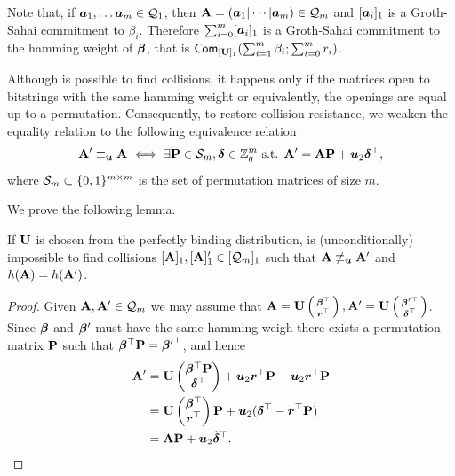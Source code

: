 Note that, if ${\boldsymbol{a}}_1,\ldots {\boldsymbol{a}}_m\in\mathcal{Q}_{1}$, then $\matr{A} = (\vec{a}_1\cat\cdots\cat\vecb{a}_m)\in\mathcal{Q}_{m}$ and $[{\boldsymbol{a}}_i]_1$ is a Groth-Sahai commitment to $\beta_i$.
Therefore $\sum_{i=0}^m[{\boldsymbol{a}}_i]_1$ is a Groth-Sahai commitment to the hamming weight of ${\boldsymbol{\beta}}$, that is $\mathsf{Com}_{[\mathbf{{U}}]_1}(\sum_{i=1}^m \beta_i;\sum_{i=0}^m r_i)$.

Although is possible to find collisions, it happens only if the matrices open to bitstrings with the same hamming weight or equivalently, the openings are equal up to a permutation. Consequently, to restore collision resistance, we weaken the equality relation to the following equivalence relation
$$
\mathbf{{A}}' \equiv_{\boldsymbol{u}} \mathbf{{A}} \iff \exists \mathbf{{P}}\in\mathcal{S}_m, {\boldsymbol{\delta}}\in\mathbb{Z}_q^m \text{ s.t. } \mathbf{{A}}' = \mathbf{{A}}\mathbf{{P}} + {\boldsymbol{u}}_2{\boldsymbol{\delta}}^\top,
$$
where $\mathcal{S}_m\subset \{0,1\}^{m\times m}$ is the set of permutation matrices of size $m$.

We prove the following lemma.
\begin{lemma}
If $\mathbf{{U}}$ is chosen from the perfectly binding distribution, is (unconditionally) impossible to find collisions $[\mathbf{{A}}]_1,[\mathbf{{A}}]_1'\in[\mathcal{Q}_m]_1$ such that $\mathbf{{A}}\not\equiv_{\boldsymbol{u}}\mathbf{{A}}'$ and $h(\mathbf{{A}})=h(\mathbf{{A}}')$.
\end{lemma}
\begin{proof}
Given $\mathbf{{A}},\mathbf{{A}}'\in\mathcal{Q}_m$ we may assume that $\mathbf{{A}}=\mathbf{{U}}\left(\begin{smallmatrix}{\boldsymbol{\beta}}^\top\\{\boldsymbol{r}}^\top\end{smallmatrix}\right),\mathbf{{A}}'=\mathbf{{U}}\left(\begin{smallmatrix}{{\boldsymbol{\beta}}'}^\top\\{\boldsymbol{\delta}}^\top\end{smallmatrix}\right)$. Since ${\boldsymbol{\beta}}$ and ${\boldsymbol{\beta}}'$ must have the same hamming weigh there exists a permutation matrix $\mathbf{{P}}$ such that ${\boldsymbol{\beta}}^\top\mathbf{{P}} = {{\boldsymbol{\beta}}'}^\top$, and hence
\begin{align*}
\mathbf{{A}}' &= \mathbf{{U}}\left(\begin{matrix}{\boldsymbol{\beta}}^\top\mathbf{{P}}\\{\boldsymbol{\delta}}^\top\end{matrix}\right)+ {\boldsymbol{u}}_2{\boldsymbol{r}}^\top\mathbf{{P}} - {\boldsymbol{u}}_2{\boldsymbol{r}}^\top\mathbf{{P}}\\
&=
\mathbf{{U}} \left(\begin{matrix}{\boldsymbol{\beta}}^\top\\{\boldsymbol{r}}^\top\end{matrix}\right)\mathbf{{P}} + {\boldsymbol{u}}_2({\boldsymbol{\delta}}^\top-{\boldsymbol{r}}^\top\mathbf{{P}})\\
 &=
 \mathbf{{A}}\mathbf{{P}} + {\boldsymbol{u}}_2\tilde{{\boldsymbol{\delta}}}^\top.
\end{align*}
\end{proof}

